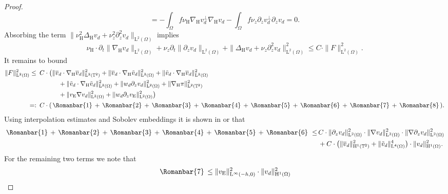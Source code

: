 \documentclass[preprint]{elsarticle}
\numberwithin{equation}{section}
\newcommand {\T}	{\mathbb{T}}
\renewcommand{\d}{\, \mathrm{d}}
\renewcommand{\H}{\mathrm{H}}
\newcommand{\dk}[1]{\partial_{#1}}
\newcommand{\dz}{\dk{z}}
\renewcommand{\bar}[1]{\overline{#1}}
\newcommand{\vbar}{\bar{v}}
\newcommand{\vtilde}{\tilde{v}}
\newcommand{\nablaH}{\nabla_{\H}}
\newcommand{\DeltaH}{\Delta_{\H}}
\newcommand{\rL}{\mathrm{L}}
\newcommand{\rH}{\H}
\newcommand{\rE}{\mathrm{E}}
\newcommand{\I}{\, \Romanbar{1} \, }
\newcommand{\II}{\, \Romanbar{2}\, }
\newcommand{\III}{\, \Romanbar{3}\, }
\newcommand{\IV}{\, \Romanbar{4}\, }
\newcommand{\V}{\, \Romanbar{5}\, }
\newcommand{\VI}{\, \Romanbar{6}\, }
\newcommand{\VII}{\, \Romanbar{7}\, }
\newcommand{\VIII}{\, \Romanbar{8}\, }
\begin{document}
\begin{proof}
\begin{equation*}
		= - \int_{\Omega} f \nu_{\rH} \nablaH v_d^\perp \nablaH v_d 
		- \int_{\Omega} f \nu_z \partial_z v_d^\perp \partial_z v_d
		= 0 .
	\end{equation*}
	Absorbing the term $\| \nu_{\rH}^2 \DeltaH v_d +\nu_z^2 \partial_z^2 v_d \|_{\rL^2(\Omega)}$ implies
	\begin{equation*}
		\nu_{\rH} \cdot \partial_t \| \nablaH v_d \|_{\rL^2(\Omega)}
		+ \nu_z \partial_t \| \dz v_d \|_{\rL^2(\Omega)}
		+ \|\DeltaH v_d + \nu_z \partial_z^2 v_d\|_{\rL^2(\Omega)}^2
		\leq C \cdot \| F \|_{\rL^2(\Omega)}^2 .
	\end{equation*}
	It remains to bound 
	\begin{align*}
		\| F \|_{\rL^2(\Omega)}^2
		\leq \enspace &C \cdot \bigl(
		\| \vbar_d \cdot \nablaH \vbar_d \|_{\rL^2(\T^2)}^2
		+	\| \vbar_d \cdot \nablaH \vtilde_d \|_{\rL^2(\Omega)}^2 
		+	\| \vtilde_d \cdot \nablaH \vbar_d \|_{\rL^2(\Omega)}^2  \\
		&\hspace{30pt} + \| \vtilde_d \cdot \nablaH \vtilde_d \|_{\rL^2(\Omega)}^2
		+ \| w_d \partial_z v_d \|_{\rL^2(\Omega)}^2
		+ \| \nablaH \pi \|_{\rL^2(\T^2)}^2 \\
		&\hspace{30pt}+ \| v_{\rE} \nabla v_d \|_{\rL^2(\Omega)}^2
		+ \| w_d \partial_z v_{\rE} \|_{\rL^2(\Omega)}^2
		\bigr) \\
		=: \enspace &C \cdot ( \I + \II + \III + \IV + \V + \VI + \VII + \VIII ) .
	\end{align*} 
	Using interpolation estimates and Sobolev embeddings it is shown in \cite[Step~4]{HK:16_2} or \cite[Step 4]{GGHHK:20_2} that
	\begin{align*}
		\I + \II + \III + \IV + \V + \VI \,
		\leq \,  
		&C \cdot \| \partial_z v_d \|_{\rL^2(\Omega)}^2 \cdot \| \nabla v_d \|_{\rL^2(\Omega)}^2 \cdot \| \nabla \partial_z v_d \|_{\rL^2(\Omega)}^2 \\
		&+ C \cdot \bigl( \| \vbar_d \|_{\rH^1(\T^2)}^2 + \| \vtilde_d\|_{\rL^4(\Omega)}^4 \bigr) \cdot \| v_d \|_{\rH^1(\Omega)}^2 .
	\end{align*}
	For the remaining two terms we note that
	\begin{equation*}
		\VII  
		\leq  \| v_{\rE} \|_{\rL^\infty(-h,0)}^2 \cdot \| v_d \|_{\rH^1(\Omega)}^2 
	\end{equation*}

\end{proof}
\end{document}
